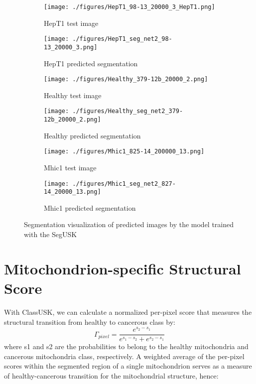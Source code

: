 \begin{figure}[ht!]
\ContinuedFloat

\begin{subfigure}{.5\textwidth}
         \centering
        \texttt{[image: ./figures/HepT1\_98-13\_20000\_3\_HepT1.png]}
        \caption{HepT1 test image}
      
    \end{subfigure}
  \begin{subfigure}{.5\textwidth}
        \centering
       \texttt{[image: ./figures/HepT1\_seg\_net2\_98-13\_20000\_3.png]}
        \caption{HepT1 predicted segmentation}
 \end{subfigure}

     \begin{subfigure}{.5\textwidth}
        \centering
        \texttt{[image: ./figures/Healthy\_379-12b\_20000\_2.png]}
        \caption{Healthy test image}
        \label{fig:healthy_label}
    \end{subfigure}
    \begin{subfigure}{.5\textwidth}
        \centering
        \texttt{[image: ./figures/Healthy\_seg\_net2\_379-12b\_20000\_2.png]}
        \caption{Healthy predicted segmentation}
        \label{fig:healthy_label}
    \end{subfigure}

\begin{subfigure}{.5\textwidth}
        \centering
        \texttt{[image: ./figures/Mhic1\_825-14\_200000\_13.png]}
        \caption{Mhic1 test image}
        \label{fig:healthy_label}
    \end{subfigure}
    \begin{subfigure}{.5\textwidth}
        \centering
        \texttt{[image: ./figures/Mhic1\_seg\_net2\_827-14\_20000\_13.png]}
        \caption{Mhic1 predicted segmentation}
        \label{fig:healthy_label}
    \end{subfigure}    

  \caption{Segmentation visualization of predicted images by the model trained with the SegUSK}
    \label{fig:seg_SegUSK} 
\end{figure}

\section{Mitochondrion-specific Structural Score}
With ClassUSK, we can calculate a normalized per-pixel score that measures the
structural transition from healthy to cancerous class by:
	 \begin{equation}
        \label{eq:cs_pixel}
            \Gamma_{pixel} = \frac {e^{s_2 - s_1}}{ e^{s_1 - s_2} + e^{s_2 - s_1} } 
   \end{equation}
where s1 and s2 are the probabilities to belong to the healthy mitochondria and 
cancerous mitochondria class, respectively. A weighted average of the per-pixel
scores within the segmented region of a single mitochondrion serves as a measure of
healthy-cancerous transition for the mitochondrial structure, hence:

